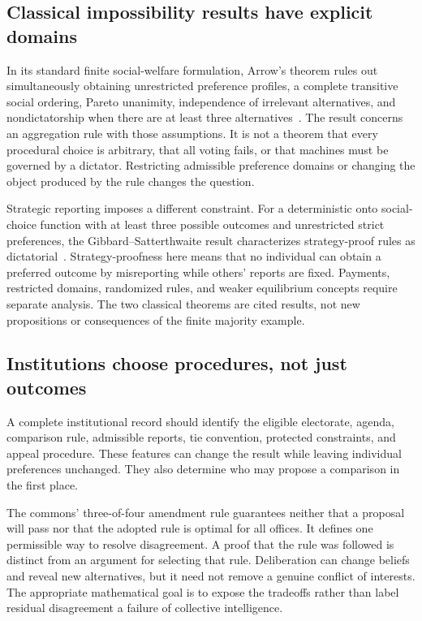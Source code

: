 \documentclass[11pt,letterpaper]{article}
\theoremstyle{plain}
\theoremstyle{definition}
\theoremstyle{remark}
\begin{document}
\subsection{Classical impossibility results have explicit domains}
In its standard finite social-welfare formulation, Arrow's theorem rules out simultaneously obtaining unrestricted preference profiles, a complete transitive social ordering, Pareto unanimity, independence of irrelevant alternatives, and nondictatorship when there are at least three alternatives~\cite{arrow}. The result concerns an aggregation rule with those assumptions. It is not a theorem that every procedural choice is arbitrary, that all voting fails, or that machines must be governed by a dictator. Restricting admissible preference domains or changing the object produced by the rule changes the question.

Strategic reporting imposes a different constraint. For a deterministic onto social-choice function with at least three possible outcomes and unrestricted strict preferences, the Gibbard--Satterthwaite result characterizes strategy-proof rules as dictatorial~\cite{gibbard,satterthwaite}. Strategy-proofness here means that no individual can obtain a preferred outcome by misreporting while others' reports are fixed. Payments, restricted domains, randomized rules, and weaker equilibrium concepts require separate analysis. The two classical theorems are cited results, not new propositions or consequences of the finite majority example.

\subsection{Institutions choose procedures, not just outcomes}
A complete institutional record should identify the eligible electorate, agenda, comparison rule, admissible reports, tie convention, protected constraints, and appeal procedure. These features can change the result while leaving individual preferences unchanged. They also determine who may propose a comparison in the first place.

The commons' three-of-four amendment rule guarantees neither that a proposal will pass nor that the adopted rule is optimal for all offices. It defines one permissible way to resolve disagreement. A proof that the rule was followed is distinct from an argument for selecting that rule. Deliberation can change beliefs and reveal new alternatives, but it need not remove a genuine conflict of interests. The appropriate mathematical goal is to expose the tradeoffs rather than label residual disagreement a failure of collective intelligence.
\end{document}
